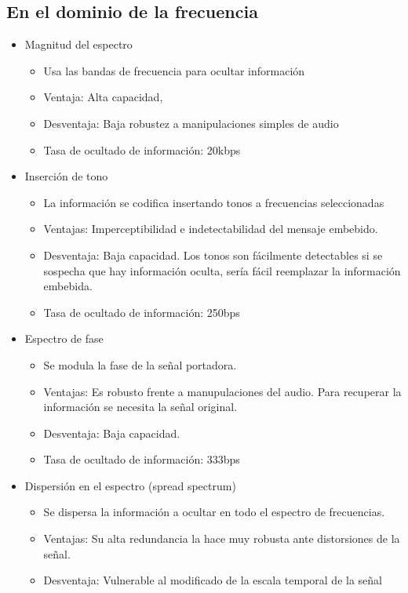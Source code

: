 \documentclass[conference,a4paper,10pt, oneside,final]{tfmpd}
\begin{document}
\subsection{En el dominio de la frecuencia}
\begin{itemize}
 \item Magnitud del espectro
   \begin{itemize}
 \item Usa las bandas de frecuencia para ocultar información
 \item Ventaja: Alta capacidad, 
 \item Desventaja: Baja robustez a manipulaciones simples de audio
 \item Tasa de ocultado de información: 20kbps
 \end{itemize}
 \item Inserción de tono
 \begin{itemize}
 \item La información se codifica insertando tonos a frecuencias seleccionadas
 \item Ventajas: Imperceptibilidad e indetectabilidad del mensaje embebido.
 \item Desventaja: Baja capacidad. Los tonos son fácilmente detectables si se sospecha que hay información oculta, sería fácil reemplazar la información embebida.
 \item Tasa de ocultado de información: 250bps
 \end{itemize}
 \item Espectro de fase
 \begin{itemize}
 \item Se modula la fase de la señal portadora.
 \item Ventajas: Es robusto frente a manupulaciones del audio. Para recuperar la información se necesita la señal original.
 \item Desventaja: Baja capacidad.
 \item Tasa de ocultado de información: 333bps
 \end{itemize}
 \item Dispersión en el espectro (spread spectrum)
  \begin{itemize}
 \item Se dispersa la información a ocultar en todo el espectro de frecuencias.
 \item Ventajas: Su alta redundancia la hace muy robusta ante distorsiones de la señal.
 \item Desventaja: Vulnerable al modificado de la escala temporal de la señal

\end{itemize}
\end{itemize}
\end{document}
